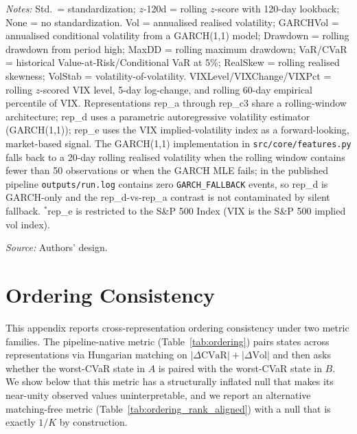 \documentclass[preprint,12pt,authoryear]{elsarticle}
\newcommand{\SPX}{S\&P 500 Index}
\begin{document}
\begin{table}[!htbp]
\begin{minipage}{\linewidth}
\textit{Notes:} Std.\ = standardization; $z$-120d = rolling $z$-score with 120-day lookback; None = no standardization. Vol = annualised realised volatility; GARCHVol = annualised conditional volatility from a GARCH(1,1) model; Drawdown = rolling drawdown from period high; MaxDD = rolling maximum drawdown; VaR/CVaR = historical Value-at-Risk/Conditional VaR at 5\%; RealSkew = rolling realised skewness; VolStab = volatility-of-volatility. VIXLevel/VIXChange/VIXPct = rolling $z$-scored VIX level, 5-day log-change, and rolling 60-day empirical percentile of VIX. Representations rep\_a through rep\_c3 share a rolling-window architecture; rep\_d uses a parametric autoregressive volatility estimator (GARCH(1,1)); rep\_e uses the VIX implied-volatility index as a forward-looking, market-based signal. The GARCH(1,1) implementation in \texttt{src/core/features.py} falls back to a 20-day rolling realised volatility when the rolling window contains fewer than 50 observations or when the GARCH MLE fails; in the published pipeline \texttt{outputs/run.log} contains zero \texttt{GARCH\_FALLBACK} events, so rep\_d is GARCH-only and the rep\_d-vs-rep\_a contrast is not contaminated by silent fallback. $^*$rep\_e is restricted to the \SPX{} (VIX is the S\&P 500 implied vol index).

\textit{Source:} Authors' design.
\end{minipage}
\end{table}

\section{Ordering Consistency}
\label{app:ordering}

This appendix reports cross-representation ordering consistency under two metric families. The pipeline-native metric (Table~\ref{tab:ordering}) pairs states across representations via Hungarian matching on $|\Delta\mathrm{CVaR}|+|\Delta\mathrm{Vol}|$ and then asks whether the worst-CVaR state in $A$ is paired with the worst-CVaR state in $B$. We show below that this metric has a structurally inflated null that makes its near-unity observed values uninterpretable, and we report an alternative matching-free metric (Table~\ref{tab:ordering_rank_aligned}) with a null that is exactly $1/K$ by construction.
\end{document}

